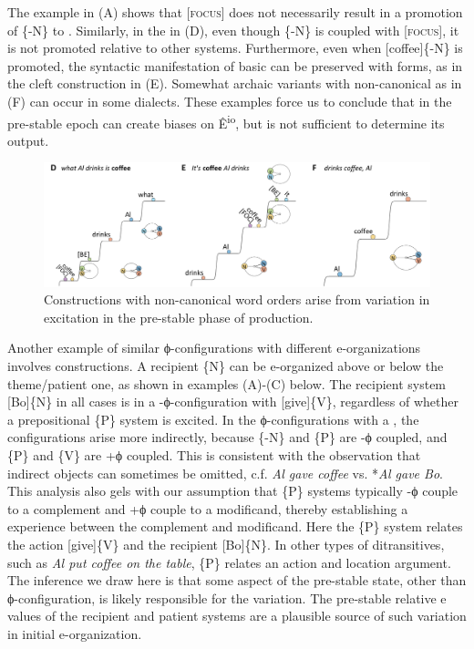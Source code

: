   The example in {}(A) shows that [\textsc{focus}] does not necessarily result in a promotion of \{-N\} to . Similarly, in the  in (D), even though \{-N\} is coupled with [\textsc{focus}], it is not promoted relative to other systems. Furthermore, even when [coffee]\{-N\} is promoted, the syntactic manifestation of basic  can be preserved with  forms, as in the cleft construction in {}(E). Somewhat archaic variants with non-canonical  as in (F) can occur in some dialects. These examples force us to conclude that  in the pre-stable epoch can create biases on Ê\textsuperscript{io}, but  is not sufficient to determine its output. 

  
\begin{figure}
\includegraphics[width=\textwidth]{figures/Tilsen-img79.png}
\caption{Constructions with non-canonical word orders arise from variation in excitation in the pre-stable phase of production.}
\label{fig:4:29}
\end{figure}
 

  Another example of similar ϕ-configurations with different e-organizations involves  constructions. A recipient \{N\} can be e-organized above or below the theme/patient one, as shown in examples (A)-(C) below. The recipient system [Bo]\{N\} in all cases is in a -ϕ-configuration with [give]\{V\}, regardless of whether a prepositional \{P\} system is excited. In the ϕ-configurations with a , the configurations arise more indirectly, because \{-N\} and \{P\} are -ϕ coupled, and \{P\} and \{V\} are +ϕ coupled. This is consistent with the observation that indirect objects can sometimes be omitted, c.f. \textit{Al gave coffee} vs. *\textit{Al gave Bo}. This analysis also gels with our assumption that \{P\} systems typically -ϕ couple to a complement and +ϕ couple to a modificand, thereby establishing a  experience between the complement and modificand. Here the \{P\} system relates the action [give]\{V\} and the recipient [Bo]\{N\}. In other types of ditransitives, such as \textit{Al put coffee on the table}, \{P\} relates an action and location argument. The inference we draw here is that some aspect of the pre-stable state, other than ϕ-configuration, is likely responsible for the variation. The pre-stable relative e values of the recipient and patient systems are a plausible source of such variation in initial e-organization.

